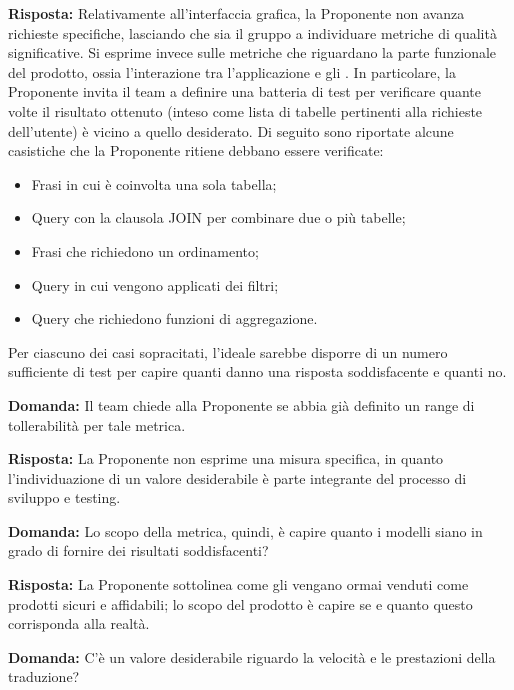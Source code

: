 \par \textbf{Risposta:} Relativamente all'interfaccia grafica, la Proponente non avanza richieste specifiche, lasciando che sia il gruppo a individuare metriche di qualità significative. Si esprime invece sulle metriche che riguardano la parte funzionale del prodotto, ossia l'interazione tra l'applicazione e gli . In particolare, la Proponente invita il team a definire una batteria di test per verificare quante volte il risultato ottenuto (inteso come lista di tabelle pertinenti alla richieste dell'utente) è vicino a quello desiderato. Di seguito sono riportate alcune casistiche che la Proponente ritiene debbano essere verificate:
\begin{itemize}
	\item Frasi in cui è coinvolta una sola tabella;
	\item Query con la clausola JOIN per combinare due o più tabelle;
	\item Frasi che richiedono un ordinamento;
	\item Query in cui vengono applicati dei filtri;
	\item Query che richiedono funzioni di aggregazione.
\end{itemize}
Per ciascuno dei casi sopracitati, l'ideale sarebbe disporre di un numero sufficiente di test per capire quanti danno una risposta soddisfacente e quanti no.

\par \textbf{Domanda:} Il team chiede alla Proponente se abbia già definito un range di tollerabilità per tale metrica.

\par \textbf{Risposta:} La Proponente non esprime una misura specifica, in quanto l'individuazione di un valore desiderabile è parte integrante del processo di sviluppo e testing.

\par \textbf{Domanda:} Lo scopo della metrica, quindi, è capire quanto i modelli siano in grado di fornire dei risultati soddisfacenti?

\par \textbf{Risposta:} La Proponente sottolinea come gli  vengano ormai venduti come prodotti sicuri e affidabili; lo scopo del prodotto è capire se e quanto questo corrisponda alla realtà.

\par \textbf{Domanda:} C'è un valore desiderabile riguardo la velocità e le prestazioni della traduzione?

